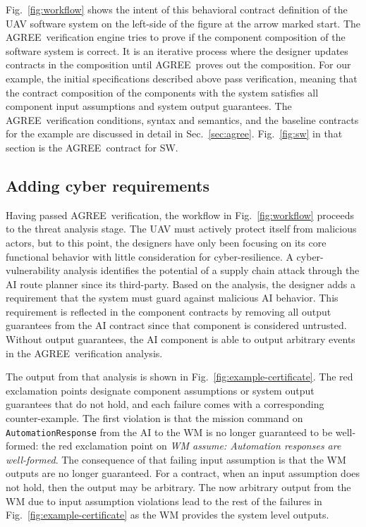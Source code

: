 \documentclass[global,twocolumn]{svjour}
\newcommand{\figref}[1]{Fig.~\ref{#1}}
\newcommand{\secref}[1]{Sec.~\ref{#1}}
\newcommand{\agr}{AGREE}
\begin{document}
\figref{fig:workflow} shows the intent of this behavioral contract definition of the UAV software system on the left-side of the figure at the arrow marked start.
%
The \agr\ verification engine tries to prove if the component composition of the software system is correct.
%
It is an iterative process where the designer updates contracts in the composition until \agr\ proves out the composition.
%
For our example, the initial specifications described above pass verification, meaning that the contract composition of the components with the system satisfies all component input assumptions and system output guarantees.
%
The \agr\ verification conditions, syntax and semantics, and the baseline contracts for the example are discussed in detail in \secref{sec:agree}.
%
\figref{fig:sw} in that section is the \agr\ contract for SW.


\subsection{Adding cyber requirements}

Having passed \agr\ verification, the workflow in \figref{fig:workflow} proceeds to the threat analysis stage.
%
The UAV must actively protect itself from malicious actors, but to this point, the designers have only been focusing on its core functional behavior with little consideration for cyber-resilience.
%
A cyber-vulnerability analysis identifies the potential of a supply chain attack through the AI route planner since its third-party.
%
Based on the analysis, the designer adds a requirement that the system must guard against malicious AI behavior.
%
This requirement is reflected in the component contracts by removing all output guarantees from the AI contract since that component is considered untrusted.
%
Without output guarantees, the AI component is able to output arbitrary events in the \agr\ verification analysis.

The output from that analysis is shown in \figref{fig:example-certificate}.
%
The red exclamation points designate component assumptions or system output guarantees that do not hold, and each failure comes with a corresponding counter-example.
%
The first violation is that the mission command on \texttt{AutomationResponse} from the AI to the WM is no longer guaranteed to be well-formed: the red exclamation point on \emph{WM assume: Automation responses are well-formed}.
%
The consequence of that failing input assumption is that the WM outputs are no longer guaranteed.
%
For a contract, when an input assumption does not hold, then the output may be arbitrary.
%
The now arbitrary output from the WM due to input assumption violations lead to the rest of the failures in \figref{fig:example-certificate} as the WM provides the system level outputs.
\end{document}
